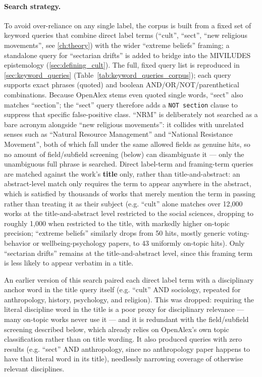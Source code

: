 \paragraph{Search strategy.} To avoid over-reliance on any single label, the corpus is built from a fixed set of keyword queries that combine direct label terms (\enquote{cult}, \enquote{sect}, \enquote{new religious movements}, see \ref{ch:theory}) with the wider \enquote{extreme beliefs} framing; a standalone query for \enquote{sectarian drifts} is added to bridge into the MIVILUDES epistemology (\ref{sec:defining_cult}). The full, fixed query list is reproduced in \ref{sec:keyword_queries} (Table~\ref{tab:keyword_queries_corpus}); each query supports exact phrases (quoted) and boolean AND/OR/NOT/parenthetical combinations. Because OpenAlex stems even quoted single words, \enquote{sect} also matches \enquote{section}; the \enquote{sect} query therefore adds a \texttt{NOT section} clause to suppress that specific false-positive class. \enquote{NRM} is deliberately not searched as a bare acronym alongside \enquote{new religious movements}: it collides with unrelated senses such as \enquote{Natural Resource Management} and \enquote{National Resistance Movement}, both of which fall under the same allowed fields as genuine hits, so no amount of field/subfield screening (below) can disambiguate it — only the unambiguous full phrase is searched. Direct label-term and framing-term queries are matched against the work's \textbf{title} only, rather than title-and-abstract: an abstract-level match only requires the term to appear anywhere in the abstract, which is satisfied by thousands of works that merely mention the term in passing rather than treating it as their subject (e.g. \enquote{cult} alone matches over 12{,}000 works at the title-and-abstract level restricted to the social sciences, dropping to roughly 1{,}000 when restricted to the title, with markedly higher on-topic precision; \enquote{extreme beliefs} similarly drops from 50 hits, mostly generic voting-behavior or wellbeing-psychology papers, to 43 uniformly on-topic hits). Only \enquote{sectarian drifts} remains at the title-and-abstract level, since this framing term is less likely to appear verbatim in a title.

An earlier version of this search paired each direct label term with a disciplinary anchor word in the title query itself (e.g. \enquote{cult} AND sociology, repeated for anthropology, history, psychology, and religion). This was dropped: requiring the literal discipline word in the title is a poor proxy for disciplinary relevance — many on-topic works never use it — and it is redundant with the field/subfield screening described below, which already relies on OpenAlex's own topic classification rather than on title wording. It also produced queries with zero results (e.g. \enquote{sect} AND anthropology, since no anthropology paper happens to have that literal word in its title), needlessly narrowing coverage of otherwise relevant disciplines.

